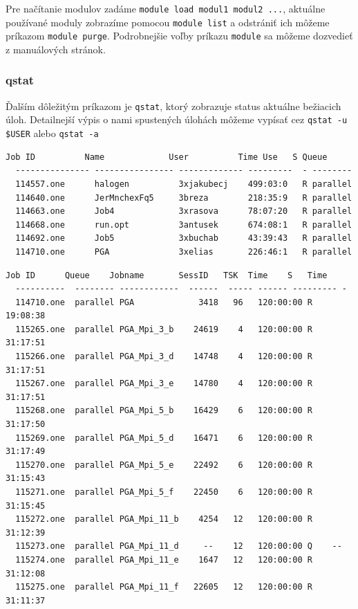 Pre načítanie modulov zadáme \texttt{module load modul1 modul2 ...}, aktuálne používané moduly zobrazíme pomocou
\texttt{module list} a odstrániť ich môžeme príkazom \texttt{module purge}.
Podrobnejšie voľby príkazu \texttt{module} sa môžeme dozvedieť z manuálových stránok.

\subsubsection{qstat}
Ďalším dôležitým príkazom je \texttt{qstat}, ktorý zobrazuje status aktuálne bežiacich úloh.
Detailnejší výpis o nami spustených úlohách môžeme vypísať cez \texttt{qstat -u \$USER} alebo \texttt{qstat -a}

\begin{lstlisting}[caption={qstat}]
  Job ID          Name             User          Time Use   S Queue
  --------------- ---------------- ------------- ---------  - --------
  114557.one      halogen          3xjakubecj    499:03:0   R parallel
  114640.one      JerMnchexFq5     3breza        218:35:9   R parallel
  114663.one      Job4             3xrasova      78:07:20   R parallel
  114668.one      run.opt          3antusek      674:08:1   R parallel
  114692.one      Job5             3xbuchab      43:39:43   R parallel
  114710.one      PGA              3xelias       226:46:1   R parallel
\end{lstlisting}

\begin{lstlisting}[caption={qstat -u 3xelias}]
  Job ID      Queue    Jobname       SessID   TSK  Time    S   Time
  ----------  -------- ------------  ------  ----- ------ --------- - 
  114710.one  parallel PGA             3418   96   120:00:00 R 19:08:38
  115265.one  parallel PGA_Mpi_3_b    24619    4   120:00:00 R 31:17:51
  115266.one  parallel PGA_Mpi_3_d    14748    4   120:00:00 R 31:17:51
  115267.one  parallel PGA_Mpi_3_e    14780    4   120:00:00 R 31:17:51
  115268.one  parallel PGA_Mpi_5_b    16429    6   120:00:00 R 31:17:50
  115269.one  parallel PGA_Mpi_5_d    16471    6   120:00:00 R 31:17:49
  115270.one  parallel PGA_Mpi_5_e    22492    6   120:00:00 R 31:15:43
  115271.one  parallel PGA_Mpi_5_f    22450    6   120:00:00 R 31:15:45
  115272.one  parallel PGA_Mpi_11_b    4254   12   120:00:00 R 31:12:39
  115273.one  parallel PGA_Mpi_11_d     --    12   120:00:00 Q    -- 
  115274.one  parallel PGA_Mpi_11_e    1647   12   120:00:00 R 31:12:08
  115275.one  parallel PGA_Mpi_11_f   22605   12   120:00:00 R 31:11:37
\end{lstlisting}

